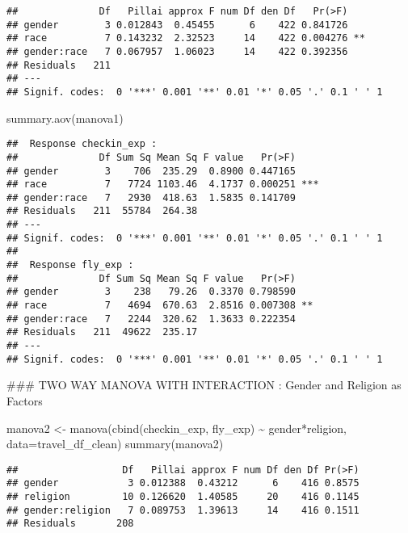 \documentclass[
]{article}
\newenvironment{Shaded}{\begin{snugshade}}{\end{snugshade}}
\newcommand{\AttributeTok}[1]{\textcolor[rgb]{0.77,0.63,0.00}{#1}}
\newcommand{\FunctionTok}[1]{\textcolor[rgb]{0.00,0.00,0.00}{#1}}
\newcommand{\NormalTok}[1]{#1}
\newcommand{\OtherTok}[1]{\textcolor[rgb]{0.56,0.35,0.01}{#1}}
\newcommand{\SpecialCharTok}[1]{\textcolor[rgb]{0.00,0.00,0.00}{#1}}
\begin{document}
\begin{verbatim}
##              Df   Pillai approx F num Df den Df   Pr(>F)   
## gender        3 0.012843  0.45455      6    422 0.841726   
## race          7 0.143232  2.32523     14    422 0.004276 **
## gender:race   7 0.067957  1.06023     14    422 0.392356   
## Residuals   211                                            
## ---
## Signif. codes:  0 '***' 0.001 '**' 0.01 '*' 0.05 '.' 0.1 ' ' 1
\end{verbatim}

\begin{Shaded}
\begin{Highlighting}[]
\FunctionTok{summary.aov}\NormalTok{(manova1)}
\end{Highlighting}
\end{Shaded}

\begin{verbatim}
##  Response checkin_exp :
##              Df Sum Sq Mean Sq F value   Pr(>F)    
## gender        3    706  235.29  0.8900 0.447165    
## race          7   7724 1103.46  4.1737 0.000251 ***
## gender:race   7   2930  418.63  1.5835 0.141709    
## Residuals   211  55784  264.38                     
## ---
## Signif. codes:  0 '***' 0.001 '**' 0.01 '*' 0.05 '.' 0.1 ' ' 1
## 
##  Response fly_exp :
##              Df Sum Sq Mean Sq F value   Pr(>F)   
## gender        3    238   79.26  0.3370 0.798590   
## race          7   4694  670.63  2.8516 0.007308 **
## gender:race   7   2244  320.62  1.3633 0.222354   
## Residuals   211  49622  235.17                    
## ---
## Signif. codes:  0 '***' 0.001 '**' 0.01 '*' 0.05 '.' 0.1 ' ' 1
\end{verbatim}

\hfill\break
\#\#\# TWO WAY MANOVA WITH INTERACTION : Gender and Religion as Factors

\begin{Shaded}
\begin{Highlighting}[]
\NormalTok{manova2 }\OtherTok{\textless{}{-}} \FunctionTok{manova}\NormalTok{(}\FunctionTok{cbind}\NormalTok{(checkin\_exp, fly\_exp) }\SpecialCharTok{\textasciitilde{}}\NormalTok{ gender}\SpecialCharTok{*}\NormalTok{religion, }\AttributeTok{data=}\NormalTok{travel\_df\_clean)}
\FunctionTok{summary}\NormalTok{(manova2)}
\end{Highlighting}
\end{Shaded}

\begin{verbatim}
##                  Df   Pillai approx F num Df den Df Pr(>F)
## gender            3 0.012388  0.43212      6    416 0.8575
## religion         10 0.126620  1.40585     20    416 0.1145
## gender:religion   7 0.089753  1.39613     14    416 0.1511
## Residuals       208
\end{verbatim}
\end{document}
